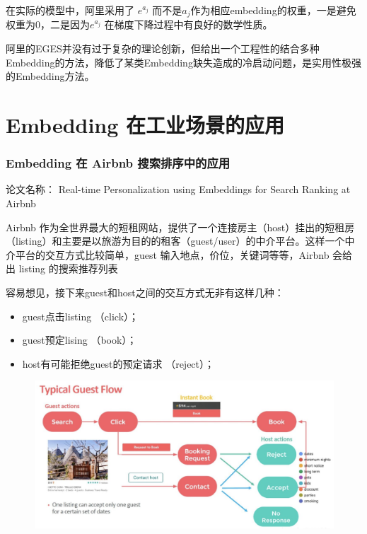 \documentclass[12pt]{article}
\begin{document}
在实际的模型中，阿里采用了 $e^{a_j}$ 而不是$a_j$作为相应embedding的权重，一是避免权重为0，二是因为$e^{a_j}$ 在梯度下降过程中有良好的数学性质。

阿里的EGES并没有过于复杂的理论创新，但给出一个工程性的结合多种Embedding的方法，降低了某类Embedding缺失造成的冷启动问题，是实用性极强的Embedding方法。

\part{Embedding 在工业场景的应用}
\section{Embedding 在 Airbnb 搜索排序中的应用
\cite{Embedding_In_Realtime_Search_In_Airbnb}\cite{How_Airbnb_Solve_Sparse_Problem_In_Embedding}}
论文名称： Real-time Personalization using Embeddings for Search Ranking at Airbnb 

Airbnb 作为全世界最大的短租网站，提供了一个连接房主（host）挂出的短租房（listing）和主要是以旅游为目的的租客（guest/user）的中介平台。这样一个中介平台的交互方式比较简单，guest 输入地点，价位，关键词等等，Airbnb 会给出 listing 的搜索推荐列表

容易想见，接下来guest和host之间的交互方式无非有这样几种：
\begin{itemize}
\setlength{\itemsep}{0pt}
\setlength{\parsep}{0pt}
\setlength{\parskip}{0pt}
    \item guest点击listing （click）；
    \item guest预定lising （book）；
    \item host有可能拒绝guest的预定请求 （reject）；
\end{itemize}
\begin{figure}[H]
    \centering
    \includegraphics[width=1\textwidth]{fig/Airbnb_User_Interaction.png}
\end{figure}
\end{document}
